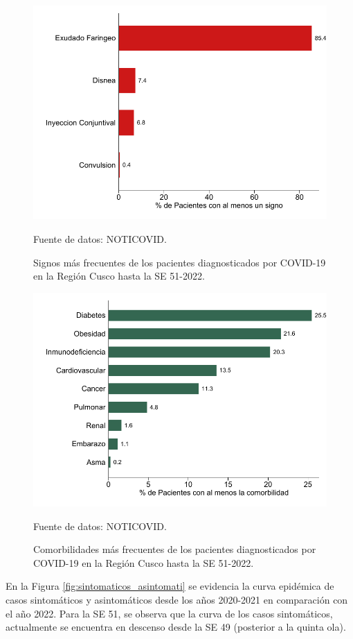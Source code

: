 \documentclass[12pt,a4paper,openany]{book}
\begin{document}
	\begin{figure}[h]
		\caption{Signos más frecuentes de los pacientes diagnosticados por COVID-19 en la Región Cusco hasta la SE 51-2022.}\label{fig:signos}
		\begin{center}
			\includegraphics[width=0.65\linewidth]{../figuras/figura_signo.pdf}
		\end{center}
		{\footnotesize {Fuente de datos: NOTICOVID.}}
	\end{figure}
	
	
	  
	\begin{figure}[h]
				\caption{Comorbilidades más frecuentes de los pacientes diagnosticados por COVID-19 en la Región Cusco hasta la SE 51-2022. }\label{fig:comorbilidades}
		\begin{center}
			\includegraphics[width=0.65\linewidth]{../figuras/figura_comorbilidad.pdf}
		\end{center}
		{\footnotesize {Fuente de datos: NOTICOVID.}}
	\end{figure}
	\clearpage
	En la Figura \ref{fig:sintomaticos_asintomati} se evidencia la curva epidémica de casos sintomáticos y asintomáticos desde los años 2020-2021 en comparación con el año 2022. Para la SE 51, se observa que la curva de los casos sintomáticos, actualmente se encuentra en descenso desde la SE 49 (posterior a la quinta ola).
	
\end{document}
